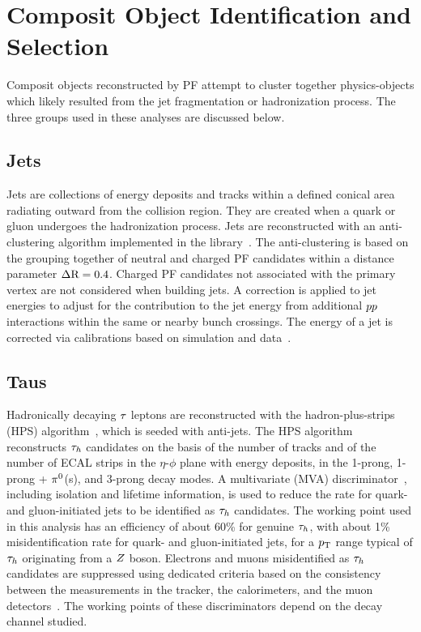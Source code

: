\section{Composit Object Identification and Selection}
Composit objects reconstructed by PF attempt to cluster together physics-objects which likely
resulted from the jet fragmentation or hadronization process. The three groups used in these
analyses are discussed below.

 
\subsection{Jets}
Jets are collections of energy deposits and tracks within a defined conical area radiating outward
from the collision region. They are created when a quark or gluon undergoes the hadronization process.
Jets are reconstructed with an anti-\kt clustering algorithm implemented in the \FASTJET 
library~\cite{Cacciari:2008gp, Cacciari:2011ma, Cacciari:fastjet2}. The anti-\kt clustering is based on the grouping
together of neutral and charged PF candidates within a distance parameter $\Delta \mathrm{R} = 0.4$. Charged PF 
candidates not associated with the primary vertex are not considered when building jets.
A correction is applied to jet energies to adjust for the contribution to the jet energy from 
additional $pp$ interactions within the same or nearby bunch crossings. The energy of a jet is 
corrected via calibrations based on simulation and data~\cite{CMS-JME-10-011}.


\subsection{Taus}
Hadronically decaying $\tau$ leptons
are reconstructed with the hadron-plus-strips (HPS)
algorithm~\cite{Khachatryan:2015dfa, CMS-PAS-TAU-16-002}, which is
seeded with anti-\kt jets.
The HPS algorithm reconstructs $\tau_{h}$ candidates on the basis of the
number of tracks and of the number of ECAL strips in the $\eta$-$\phi$ plane with energy deposits, in the 1-prong,
1-prong + $\pi^{0}$(s), and 3-prong decay modes. A
multivariate (MVA) discriminator~\cite{Hocker:2007ht}, including isolation
and lifetime information, is used to reduce the rate for  quark- and gluon-initiated jets
to be identified as $\tau_{h}$ candidates. The working point used in this analysis
has an efficiency of about 60\% for genuine $\tau_{h}$,
with about 1\% misidentification rate for quark- and gluon-initiated jets, for a $p_\mathrm{T}$ range typical of $\tau_{h}$ originating from a $Z$ boson.
Electrons and muons misidentified as $\tau_{h}$ candidates are suppressed using dedicated criteria
based on the consistency between the measurements in the tracker, the calorimeters, and the muon detectors~\cite{Khachatryan:2015dfa, CMS-PAS-TAU-16-002}.
The working points of these discriminators depend on the
decay channel studied.


